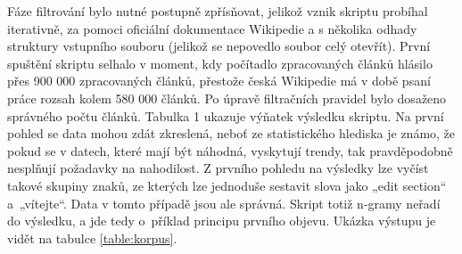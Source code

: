 \documentclass[a4paper, twoside, 12pt, czech]{article}
\begin{document}
Fáze filtrování bylo nutné postupně zpřísňovat, jelikož vznik skriptu probíhal iterativně, za pomoci 
oficiální dokumentace Wikipedie a s několika odhady struktury vstupního souboru (jelikož se nepovedlo soubor celý otevřít).
První spuštění skriptu selhalo v moment, kdy počítadlo zpracovaných článků hlási\-lo přes 900 000 zpracovaných 
článků, přestože česká Wikipedie má v době psaní práce rozsah kolem 580 000 článků. Po úpravě filtračních 
pravidel bylo dosaženo správného počtu článků. Tabulka 1 ukazuje výňatek výsledku skriptu. Na první pohled 
se data mohou zdát zkreslená, neboť ze statistického hlediska je známo, že pokud se v datech, které mají 
být náhodná, vyskytují trendy, tak pravděpodobně nesplňují požadavky na nahodilost. Z prvního pohledu na 
výsledky lze vyčíst takové skupiny znaků, ze kterých lze jednoduše sestavit slova jako „edit section“ a~„vítejte“. 
Data v tomto případě jsou ale správná. Skript totiž n-gramy neřadí do výsledku, a jde tedy
o~příklad principu prvního objevu. Ukázka výstupu je vidět na tabulce \ref{table:korpus}.
\end{document}
